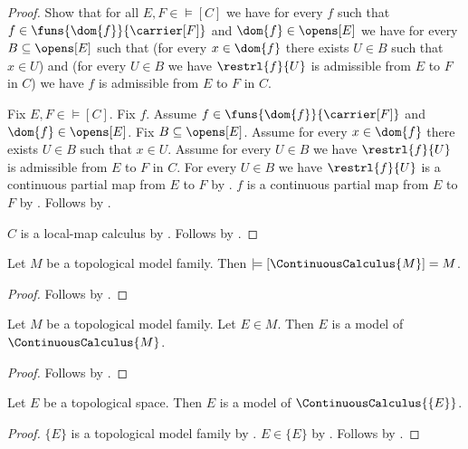 \begin{proof}
    Show that for all $E,F\in\models[C]$ we have for every $f$ such that
        $f\in\funs{\dom{f}}{\carrier[F]}$ and $\dom{f}\in\opens[E]$ we have
        for every $B\subseteq\opens[E]$ such that
            (for every $x\in\dom{f}$ there exists $U\in B$ such that $x\in U$) and
            (for every $U\in B$ we have
                $\restrl{f}{U}$ is admissible from $E$ to $F$ in $C$)
        we have $f$ is admissible from $E$ to $F$ in $C$.
    \begin{subproof}
        Fix $E,F\in\models[C]$.
        Fix $f$.
        Assume $f\in\funs{\dom{f}}{\carrier[F]}$ and $\dom{f}\in\opens[E]$.
        Fix $B\subseteq\opens[E]$.
        Assume for every $x\in\dom{f}$ there exists $U\in B$ such that $x\in U$.
        Assume for every $U\in B$ we have
            $\restrl{f}{U}$ is admissible from $E$ to $F$ in $C$.
        For every $U\in B$ we have
            $\restrl{f}{U}$ is a continuous partial map from $E$ to $F$ by
            .
        $f$ is a continuous partial map from $E$ to $F$ by
            .
        Follows by .
    \end{subproof}
    $C$ is a local-map calculus by .
    Follows by .
\end{proof}

\begin{proposition}\label{continuous_calculus_models}
    Let $M$ be a topological model family.
    Then $\models[\ContinuousCalculus{M}]=M$.
\end{proposition}
\begin{proof}
    Follows by .
\end{proof}

\begin{classification}\label{continuous_calculus_model}
    Let $M$ be a topological model family.
    Let $E\in M$.
    Then $E$ is a model of $\ContinuousCalculus{M}$.
\end{classification}
\begin{proof}
    Follows by .
\end{proof}

\begin{classification}\label{singleton_continuous_calculus_model}
    Let $E$ be a topological space.
    Then $E$ is a model of $\ContinuousCalculus{\{E\}}$.
\end{classification}
\begin{proof}
    $\{E\}$ is a topological model family by .
    $E\in\{E\}$ by .
    Follows by .
\end{proof}

